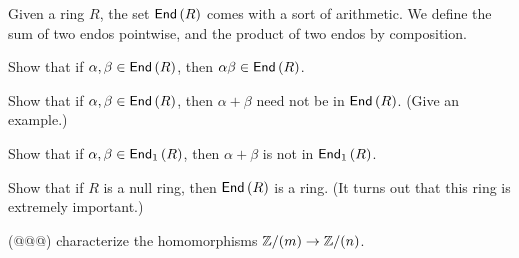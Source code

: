 \begin{exercise}
Given a ring \(R\), the set \( \mathsf{End}\left(R\right) \) comes with a sort of arithmetic. We define the sum of two endos pointwise, and the product of two endos by composition.
\begin{proplist}
\item Show that if \(\alpha, \beta \in  \mathsf{End}\left(R\right) \), then \(\alpha\beta \in  \mathsf{End}\left(R\right) \).
\item Show that if \(\alpha, \beta \in  \mathsf{End}\left(R\right) \), then \(\alpha + \beta\) need not be in \( \mathsf{End}\left(R\right) \). (Give an example.)
\item Show that if \(\alpha, \beta \in  \mathsf{End}_1\left(R\right) \), then \(\alpha + \beta\) is not in \( \mathsf{End}_1\left(R\right) \).
\end{proplist}
\end{exercise}

\begin{exercise}
Show that if \(R\) is a null ring, then \( \mathsf{End}\left(R\right) \) is a ring. (It turns out that this ring is extremely important.)
\end{exercise}

(@@@) characterize the homomorphisms \(\mathbb{Z}/(m) \rightarrow \mathbb{Z}/(n)\).

